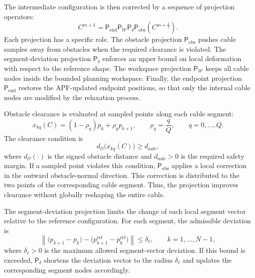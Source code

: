 \documentclass{pas}
\begin{document}
The intermediate configuration is then corrected by a sequence of projection
operators:
\begin{equation}
C^{m+1}
=
\mathsf{P}_{\mathrm{end}}
\mathsf{P}_{\mathcal{W}}
\mathsf{P}_{\delta}
\mathsf{P}_{\mathrm{obs}}
\left(
C^{m+\frac{1}{2}}
\right).
\label{eq:relaxation_projection_step}
\end{equation}
Each projection has a specific role. The obstacle projection \(\mathsf{P}_{\mathrm{obs}}\) pushes cable samples away from obstacles when the required clearance is violated. The segment-deviation projection \(\mathsf{P}_{\delta}\) enforces an upper bound on local deformation with respect to the reference shape. The workspace projection \(\mathsf{P}_{\mathcal{W}}\) keeps all cable nodes inside the bounded planning workspace. Finally, the endpoint projection \(\mathsf{P}_{\mathrm{end}}\) restores the APF-updated endpoint positions, so that only the internal cable nodes are modified by the relaxation process.

Obstacle clearance is evaluated at sampled points along each cable segment:
\begin{equation}
x_{kq}(C)
=
(1-\rho_q)p_k+\rho_q p_{k+1},
\qquad
\rho_q=\frac{q}{Q},
\qquad
q=0,\ldots,Q .
\label{eq:relaxation_sampled_points}
\end{equation}
The clearance condition is
\begin{equation}
d_{\mathcal{O}}\bigl(x_{kq}(C)\bigr)
\geq
d_{\mathrm{safe}},
\label{eq:relaxation_clearance_constraint}
\end{equation}
where \(d_{\mathcal{O}}(\cdot)\) is the signed obstacle distance and
\(d_{\mathrm{safe}}>0\) is the required safety margin. If a sampled point
violates this condition, \(\mathsf{P}_{\mathrm{obs}}\) applies a local correction in
the outward obstacle-normal direction. This correction is distributed to the
two points of the corresponding cable segment. Thus, the projection improves
clearance without globally reshaping the entire cable.

The segment-deviation projection limits the change of each local segment vector
relative to the reference configuration. For each segment, the admissible
deviation is
\begin{equation}
\left\|
\bigl(p_{k+1}-p_k\bigr)
-
\bigl(p_{k+1}^{\mathrm{ref}}-p_k^{\mathrm{ref}}\bigr)
\right\|
\leq
\delta_{\ell},
\qquad
k=1,\ldots,N-1 ,
\label{eq:relaxation_segment_constraint}
\end{equation}
where \(\delta_{\ell}>0\) is the maximum allowed segment-vector deviation. If
this bound is exceeded, \(\mathsf{P}_{\delta}\) shortens the deviation vector to the
radius \(\delta_{\ell}\) and updates the corresponding segment nodes
accordingly.
\end{document}
